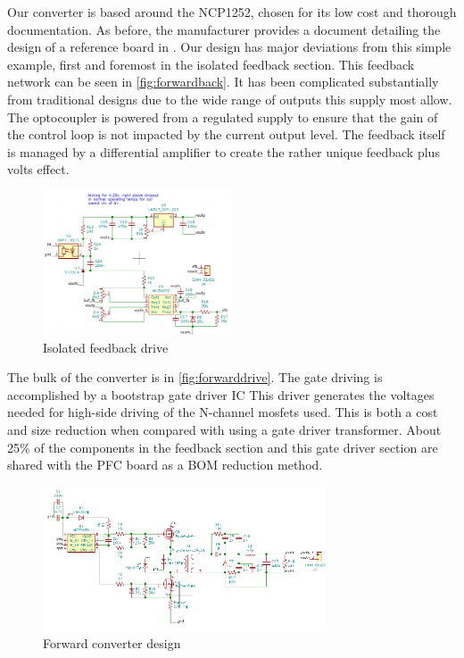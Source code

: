 \documentclass[12pt]{article}
\begin{document}
Our converter is based around the NCP1252, chosen for its low cost and thorough documentation. As before, the manufacturer provides a document detailing the design of a reference board in \cite{9}. Our design has major deviations from this simple example, first and foremost in the isolated feedback section. This feedback network can be seen in \autoref{fig:forwardback}. It has been complicated substantially from traditional designs due to the wide range of outputs this supply most allow. The optocoupler is powered from a regulated supply to ensure that the gain of the control loop is not impacted by the current output level. The feedback itself is managed by a differential amplifier to create the rather unique feedback plus volts effect.

\begin{figure}[H]
    \centering
    \includegraphics[width=0.5\textwidth]{forwardfeedback}
    \caption{Isolated feedback drive}
    \label{fig:forwardback}
\end{figure}

The bulk of the converter is in \autoref{fig:forwarddrive}. The gate driving is accomplished by a bootstrap gate driver IC This driver generates the voltages needed for high-side driving of the N-channel mosfets used. This is both a cost and size reduction when compared with using a gate driver transformer. About 25\% of the components in the feedback section and this gate driver section are shared with the PFC board as a BOM reduction method.

\begin{figure}[H]
    \centering
    \includegraphics[width=0.75\textwidth]{forwarddrive}
    \caption{Forward converter design}
    \label{fig:forwarddrive}
\end{figure}
\end{document}
